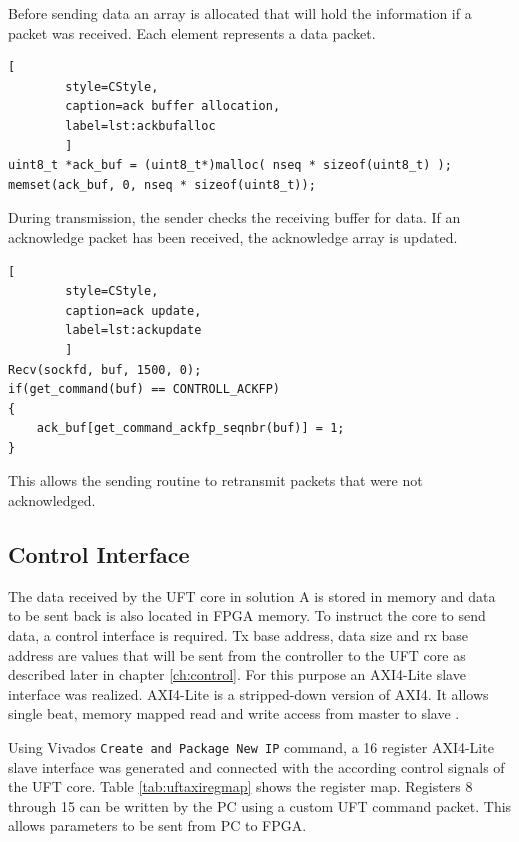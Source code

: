 Before sending data an array is allocated that will hold the information if a
packet was received. Each element represents a data packet.

\begin{minipage}{\linewidth}
    \begin{lstlisting}[
        style=CStyle, 
        caption=ack buffer allocation, 
        label=lst:ackbufalloc
        ]
uint8_t *ack_buf = (uint8_t*)malloc( nseq * sizeof(uint8_t) );
memset(ack_buf, 0, nseq * sizeof(uint8_t));\end{lstlisting}
\end{minipage}

During transmission, the sender checks the receiving buffer for data. If an
acknowledge packet has been received, the acknowledge array is updated.

\begin{minipage}{\linewidth}
    \begin{lstlisting}[
        style=CStyle, 
        caption=ack update, 
        label=lst:ackupdate
        ]
Recv(sockfd, buf, 1500, 0);
if(get_command(buf) == CONTROLL_ACKFP)
{
    ack_buf[get_command_ackfp_seqnbr(buf)] = 1;
}\end{lstlisting}
\end{minipage}

This allows the sending routine to retransmit packets that were not
acknowledged.

\subsection{Control Interface}
The data received by the UFT core in solution A is stored in memory and data to
be sent back
is also located in FPGA memory. To instruct the core to send data, a control
interface is required. Tx base address, data size and rx base address are values
that will be sent from the controller to the UFT core as described later in
chapter \ref{ch:control}. For this purpose an AXI4-Lite slave interface was
realized. AXI4-Lite is a stripped-down version of AXI4. It allows single beat,
memory mapped read and write access from master to slave \cite{axispecs}.

Using Vivados \texttt{Create and Package New IP} command, a 16 register
AXI4-Lite slave interface was generated and connected with the according control
signals of the UFT core. Table \ref{tab:uftaxiregmap} shows the register map.
Registers 8 through 15 can be written by the PC using a custom UFT command
packet. This allows parameters to be sent from PC to FPGA.

